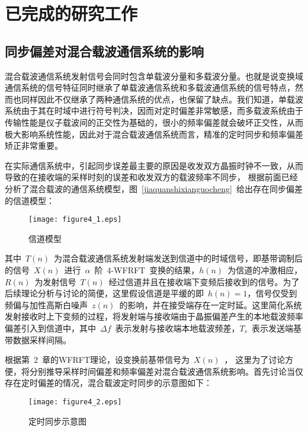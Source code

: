 
\section{已完成的研究工作}
\subsection{同步偏差对混合载波通信系统的影响}

混合载波通信系统发射信号会同时包含单载波分量和多载波分量。也就是说变换域通信系统的信号特征同时继承了单载波通信系统和多载波通信系统的信号特点，然而也同样因此不仅继承了两种通信系统的优点，也保留了缺点。我们知道，单载波系统由于其在时域中进行符号判决，因而对定时偏差非常敏感，而多载波系统由于传输性能是仪子载波间的正交性为基础的，很小的频率偏差就会破坏正交性，从而极大影响系统性能，因此对于混合载波通信系统而言，精准的定时同步和频率偏差矫正非常重要。

在实际通信系统中，引起同步误差最主要的原因是收发双方晶振时钟不一致，从而导致的在接收端的采样时刻的误差和收发双方的载波频率不同步， 根据前面已经分析了混合载波的通信系统模型，图~\ref{jiaquanshixianguocheng}~给出存在同步偏差的信道模型：
\begin{figure}[htbp]
\centering
\texttt{[image: figure4\_1.eps]}
\caption{信道模型}\vspace{-1em}\label{xindaomoxing}
\end{figure}
其中~$T(n)$~为混合载波通信系统发射端发送到信道中的时域信号，即基带调制后的信号~$X(n)$~进行~$\alpha$~阶~4-WFRFT~变换的结果，$h(n)$~为信道的冲激相应，$R(n)$~为发射信号~$T(n)$~经过信道并且在接收端下变频后接收到的信号。为了后续理论分析与讨论的简便，这里假设信道是平缓的即~$h(n)=1$，信号仅受到频偏与加性高斯白噪声~$z(n)$~的影响，并在接受端存在一定时延。这里简化系统发射接收时上下变频的过程，将发射端与接收端由于晶振偏差产生的本地载波频率偏差引入到信道中，其中~$\Delta f$~表示发射与接收端本地载波频差，$T_s$~表示发送端基带数据采样间隔。

根据第~2~章的WFRFT理论，设变换前基带信号为~$X(n)$~，
这里为了讨论方便，将分别推导采样时间偏差和频率偏差对混合载波通信系统影响。首先讨论当仅存在定时偏差的情况，混合载波定时同步的示意图如下：
\begin{figure}[htbp]
\centering
\texttt{[image: figure4\_2.eps]}
\caption{定时同步示意图}\vspace{-1em}\label{dingshitongbuweizhi}
\end{figure}

